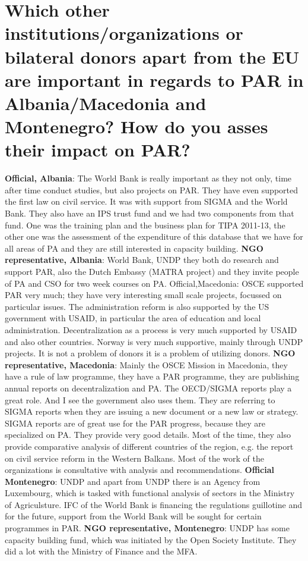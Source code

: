 \section{ Which other institutions/organizations or bilateral donors apart from the EU are important in regards to PAR in Albania/Macedonia and Montenegro? How do you asses their impact on PAR? }
\textbf{Official, Albania}: The World Bank is really important as they not only, time after time conduct studies, but also projects on PAR. They have even supported the first law on civil service. It was with support from SIGMA and the World Bank. They also have an IPS trust fund and we had two components from that fund. One was the training plan and the business plan for TIPA 2011-13, the other one was the assessment of the expenditure of this database that we have for all areas of PA and they are still interested in capacity building.
\textbf{NGO representative, Albania}: World Bank, UNDP they both do research and support PAR, also the Dutch Embassy (MATRA project) and they invite people of PA and CSO for two week courses on PA.
Official,Macedonia: OSCE supported PAR very much; they have very interesting small scale projects, focussed on particular issues. The administration reform is also supported by the US government with USAID, in particular the area of education and local administration. Decentralization as a process is very much supported by USAID and also other countries. Norway is very much supportive, mainly through UNDP projects. It is not a problem of donors it is a problem of utilizing donors. 
\textbf{NGO representative, Macedonia}: Mainly the OSCE Mission in Macedonia, they have a rule of law programme, they have a PAR programme, they are publishing annual reports on decentralization and PA. The OECD/SIGMA reports play a great role. And I see the government also uses them. They are referring to SIGMA reports when they are issuing a new document or a new law or strategy. SIGMA reports are of great use for the PAR progress, because they are specialized on PA. They provide very good details. Most of the time, they also provide comparative analysis of different countries of the region, e.g. the report on civil service reform in the Western Balkans. Most of the work of the organizations is consultative with analysis and recommendations.
\textbf{Official Montenegro}: UNDP and apart from UNDP there is an Agency from Luxembourg, which is tasked with functional analysis of sectors in the Ministry of Agriculsture. IFC of the World Bank is financing the regulations guillotine and for the future, support from the World Bank will be sought for certain programmes in PAR.
\textbf{NGO representative, Montenegro}: UNDP has some capacity building fund, which was initiated by the Open Society Institute. They did a lot with the Ministry of Finance and the MFA.%
